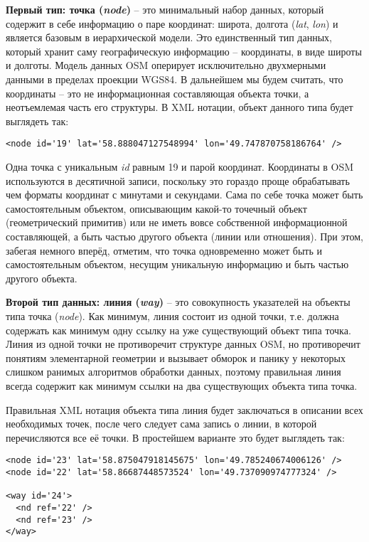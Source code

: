 \textbf{Первый тип: точка (\emph{node})} -- это минимальный набор данных, 
который содержит в себе информацию о паре координат: широта, долгота 
(\emph{lat}, \emph{lon}) и является базовым в иерархической модели. Это 
единственный тип данных, который хранит саму географическую информацию -- 
координаты, в виде широты и долготы. Модель данных OSM оперирует исключительно 
двухмерными данными в пределах проекции WGS84. В дальнейшем мы будем считать, 
что координаты -- это не информационная составляющая объекта точки, а 
неотъемлемая часть его структуры. В XML нотации, объект данного типа будет 
выглядеть так:

\small
\begin{verbatim}
<node id='19' lat='58.888047127548994' lon='49.747870758186764' />
\end{verbatim}
\normalsize

Одна точка с уникальным \emph{id} равным 19 и парой координат. Координаты в 
OSM используются в десятичной записи, поскольку это гораздо проще обрабатывать 
чем форматы координат с минутами и секундами. Сама по себе точка может быть 
самостоятельным объектом, описывающим какой-то точечный объект (геометрический 
примитив) или не иметь вовсе собственной информационной составляющей, а быть 
частью другого объекта (линии или отношения). При этом, забегая немного 
вперёд, отметим, что точка одновременно может быть и самостоятельным объектом, 
несущим уникальную информацию и быть частью другого объекта.

\textbf{Второй тип данных: линия (\emph{way})} -- это совокупность указателей 
на объекты типа точка (\emph{node}). Как минимум, линия состоит из одной 
точки, т.е. должна содержать как минимум одну ссылку на уже существующий 
объект типа точка. Линия из одной точки не противоречит структуре данных OSM, 
но противоречит понятиям элементарной геометрии и вызывает обморок и панику у 
некоторых слишком ранимых алгоритмов обработки данных, поэтому правильная 
линия всегда содержит как минимум ссылки на два существующих объекта типа 
точка.

Правильная XML нотация объекта типа линия будет заключаться в описании всех 
необходимых точек, после чего следует сама запись о линии, в которой 
перечисляются все её точки. В простейшем варианте это будет выглядеть так:

\small
\begin{verbatim}
<node id='23' lat='58.875047918145675' lon='49.785240674006126' />
<node id='22' lat='58.86687448573524' lon='49.737090974777324' />

<way id='24'>
  <nd ref='22' />
  <nd ref='23' />
</way>
\end{verbatim}
\normalsize

